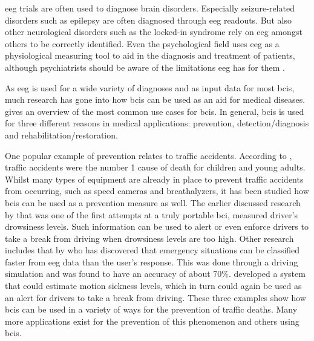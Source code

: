 \Gls{eeg} trials are often used to diagnose brain disorders.
Especially seizure-related disorders such as epilepsy are often diagnosed through \gls{eeg} readouts.
But also other neurological disorders such as the locked-in syndrome rely on \gls{eeg} amongst others to be correctly identified.
Even the psychological field uses \gls{eeg} as a physiological measuring tool to aid in the diagnosis and treatment of patients, although psychiatrists should be aware of the limitations \gls{eeg} has for them \citep{eeg_for_psychiatric}.

As \gls{eeg} is used for a wide variety of diagnoses and as input data for most \glspl{bci}, much research has gone into how \glspl{bci} can be used as an aid for medical diseases.
 gives an overview of the most common use cases for \glspl{bci}.
In general, \glspl{bci} is used for three different reasons in medical applications: prevention, detection/diagnosis and rehabilitation/restoration.

One popular example of prevention relates to traffic accidents.
According to \citet{traffic_deaths}, traffic accidents were the number 1 cause of death for children and young adults.
Whilst many types of equipment are already in place to prevent traffic accidents from occurring, such as speed cameras and breathalyzers, it has been studied how \glspl{bci} can be used as a prevention measure as well.
The earlier discussed research by \citet{early_bci_drowsiness} that was one of the first attempts at a truly portable \gls{bci}, measured driver's drowsiness levels.
Such information can be used to alert or even enforce drivers to take a break from driving when drowsiness levels are too high.
Other research includes that by \citet{eeg_dangerous_situation_car} who has discovered that emergency situations can be classified faster from \gls{eeg} data than the user's response.
This was done through a driving simulation and was found to have an accuracy of about 70\%.
 developed a system that could estimate motion sickness levels, which in turn could again be used as an alert for drivers to take a break from driving.
These three examples show how \glspl{bci} can be used in a variety of ways for the prevention of traffic deaths.
Many more applications exist for the prevention of this phenomenon and others using \glspl{bci}.

